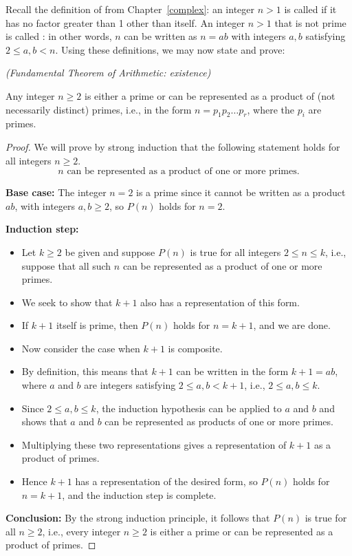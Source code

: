 Recall the definition of  from Chapter~\ref{complex}: an integer $n>1$ is called 
 if it has no factor greater than 1 other than itself. An integer $n>1$ that is not prime is called
: in other words, $n$ can be written as $n=ab$
with integers $a,b$ satisfying $2\le a,b<n$. Using these definitions, we may now state and prove:

\begin{prop}\emph{(Fundamental Theorem of Arithmetic: existence)}

Any integer $n\ge 2$
is either a prime or can be represented as a product of (not
necessarily distinct) primes, i.e., in the form $n=p_1p_2\dots p_r$,
where the $p_i$ are primes.
\end{prop}

\begin{proof}
We will prove by strong induction that the following statement  
holds for all integers $n\ge2$.
\[
\text{$n$ can be represented as a product of one or more primes.}
\tag{$P(n)$}
\]

\noindent
\textbf{Base case:} The integer $n=2$ is a prime since it cannot be
written as a product $ab$, with integers $a,b\ge 2$,  so $P(n)$ holds
for $n=2$.

\noindent
\textbf{Induction step:} 
\begin{itemize}

\item Let $k\ge2$ be given and suppose $P(n)$ is true for all 
integers $2\le n\le k$, i.e., suppose that all such $n$ can be represented 
as a product of one or more primes.
\item We seek to show that $k+1$ also has a
representation of this form.
\item
If $k+1$ itself is prime, then $P(n)$ holds for $n=k+1$, and we are done.
\item
Now consider the case when $k+1$ is composite.
\item 
By definition, this means that $k+1$
can be written in the form $k+1=ab$, where $a$ and $b$ are integers satisfying
$2\le a,b< k+1$, i.e., $2\le a,b\le k$. 
\item
Since $2\le a,b\le k$, the induction hypothesis can be applied to $a$ and $b$
and shows that $a$ and $b$ can be represented as products
of one or more primes.
\item
Multiplying these two representations gives a representation of $k+1$ as
a product of primes. 
\item
Hence $k+1$ has a representation of the desired form, so $P(n)$ holds
for $n=k+1$, and the induction step is
complete.
\end{itemize}

\noindent
\textbf{Conclusion:} By the strong induction principle, 
it follows that $P(n)$  is true for all $n\ge2$, i.e., every integer
$n\ge2$ is either a prime or can be represented as a product of primes.
\end{proof}

